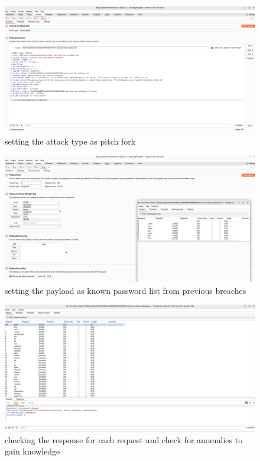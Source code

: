 \documentclass[
	a4paper, %
	12pt, %
]{CSSullivanBusinessReport}
\begin{document}
\begin{fullwidth}
\begin{fullwidth}
     \begin{figure}[H]
    \centering
    \includegraphics[width=1\textwidth]{Images/anikaScreensots/BruteForce1.png}
    \caption{setting the attack type as pitch fork}
    \label{fig:enter-label}
\end{figure}

 \begin{figure}[H]
    \centering
    \includegraphics[width=1\textwidth]{Images/anikaScreensots/bruteForce2.png}
    \caption{setting the payload as known password list from previous breaches}
    \label{fig:enter-label}
\end{figure}

 \begin{figure}[H]
    \centering
    \includegraphics[width=1\textwidth]{Images/anikaScreensots/bruteForce3.png}
    \caption{checking the response for each request and check for anomalies to gain knowledge}
    \label{fig:enter-label}
\end{figure}


\end{fullwidth}
\end{fullwidth}
\end{document}
